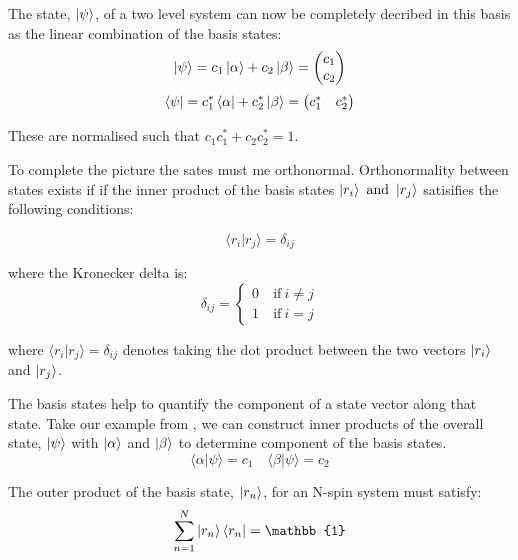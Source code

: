 The state, $\ket{\psi}$, of a two level system can now be completely decribed in this basis
as the linear combination of the basis states:
\begin{equation}\label{eqn:zeeman}
  \ket{\psi} = c_1\ket{\alpha} + c_2\ket{\beta} = \begin{pmatrix}
    c_1\\
    c_2
\end{pmatrix}
\end{equation}
\begin{equation}
  \bra{\psi} = c_1^*\bra{\alpha} + c_2^*\ket{\beta} = \begin{pmatrix}
    c_1^* & c_2^*
\end{pmatrix}
\end{equation}

These are normalised such that $c_1c_1^* + c_2c_2^* = 1$.

To complete the picture the sates must me orthonormal. Orthonormality between states exists if
if the inner product of the basis states $\ket{r_i} ~\text{and}~ \ket{r_j}$ satisifies the following conditions:

\begin{equation}
  \langle r_i\vert r_j\rangle = \delta_{ij}
\end{equation}

where the Kronecker delta is:
\begin{equation}
  \delta_{ij} = \begin{cases}
    0 & ~\text{if}~ i \ne j\\
    1 & ~\text{if}~ i = j
                \end{cases}
\end{equation}

where $\langle r_i\vert r_j\rangle = \delta_{ij}$ denotes taking the dot product between the two
vectors $\ket{r_i}$ and $\ket{r_j}$.

The basis states help to quantify the component of a state vector along that state. Take our example from , we can construct inner products of the overall state, $\ket{\psi}$ with $\ket{\alpha}$ and $\ket{\beta}$ to determine component of the basis states.
\begin{equation}
  \langle\alpha\vert\psi\rangle = c_1 \quad \langle\beta\vert\psi\rangle = c_2
\end{equation}

The outer product of the basis state, $\ket{r_n}$, for an N-spin system must satisfy:
\begin{equation}
  \sum_{n=1}^{N} \ket{r_n}\bra{r_n} = \mathbb{1}
\end{equation}

